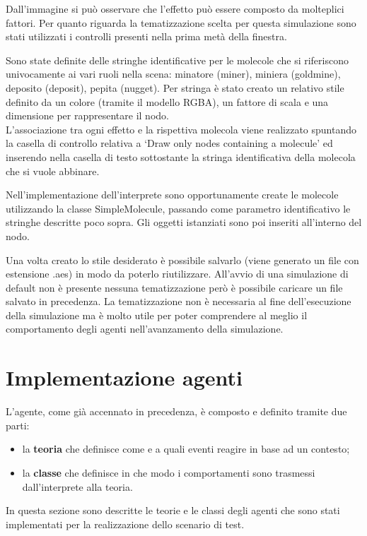 Dall'immagine si può osservare che l'effetto può essere composto da molteplici fattori.
Per quanto riguarda la tematizzazione scelta per questa simulazione sono stati utilizzati i controlli presenti nella prima metà della finestra.
\newline

Sono state definite delle stringhe identificative per le molecole che si riferiscono univocamente ai vari ruoli nella scena: minatore (miner), miniera (goldmine), deposito (deposit), pepita (nugget).
Per stringa è stato creato un relativo stile definito da un colore (tramite il modello RGBA), un fattore di scala e una dimensione per rappresentare il nodo.
\\
L'associazione tra ogni effetto e la rispettiva molecola viene realizzato spuntando la casella di controllo relativa a `Draw only nodes containing a molecule' ed inserendo nella casella di testo sottostante la stringa identificativa della molecola che si vuole abbinare.
\newline

Nell'implementazione dell'interprete sono opportunamente create le molecole utilizzando la classe SimpleMolecule, passando come parametro identificativo le stringhe descritte poco sopra. Gli oggetti istanziati sono poi inseriti all'interno del nodo.

Una volta creato lo stile desiderato è possibile salvarlo (viene generato un file con estensione .aes) in modo da poterlo riutilizzare.
All'avvio di una simulazione di default non è presente nessuna tematizzazione però è possibile caricare un file salvato in precedenza.
La tematizzazione non è necessaria al fine dell'esecuzione della simulazione ma è molto utile per poter comprendere al meglio il comportamento degli agenti nell'avanzamento della simulazione.


\section{Implementazione agenti}
L'agente, come già accennato in precedenza, è composto e definito tramite due parti:
\begin{itemize}
\item la \textbf{teoria} che definisce come e a quali eventi reagire in base ad un contesto;
\item la \textbf{classe} che definisce in che modo i comportamenti sono trasmessi dall'interprete alla teoria.
\end{itemize}
In questa sezione sono descritte le teorie e le classi degli agenti che sono stati implementati per la realizzazione dello scenario di test.


